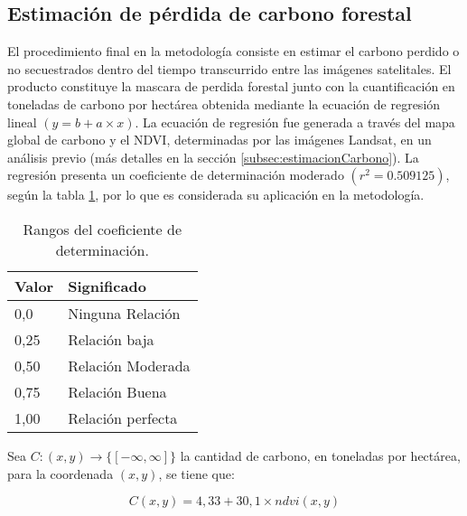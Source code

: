 \subsection{Estimaci\'on de p\'erdida de carbono forestal}
El procedimiento final en la metodolog\'ia consiste en estimar el carbono perdido o no secuestrados dentro del tiempo transcurrido entre las im\'agenes satelitales. El producto constituye la mascara de perdida forestal junto con la cuantificaci\'on en toneladas de carbono por hect\'area obtenida mediante la ecuaci\'on de regresi\'on lineal $(y= b + a \times x) $. La ecuaci\'on de regresi\'on fue generada a trav\'es del mapa global de carbono \cite{saatchi2011benchmark} y el NDVI, determinadas por las im\'agenes Landsat, en un an\'alisis previo (m\'as detalles en la secci\'on \ref{subsec:estimacionCarbono}). La regresi\'on presenta un coeficiente de determinaci\'on moderado $ (r^{2}=0.509125) $, seg\'un la tabla \ref{t:coefDeter}, por lo que es considerada su aplicaci\'on en la metodolog\'ia.
\begin{table}[H]
	\centering
	\begin{tabular}{|l|l|}
		\hline
		\textbf{Valor} & \textbf{Significado} \\ \hline
		0,0            & Ninguna Relaci\'on     \\ \hline
		0,25           & Relaci\'on baja        \\ \hline
		0,50           & Relaci\'on Moderada    \\ \hline
		0,75           & Relaci\'on Buena       \\ \hline
		1,00           & Relaci\'on perfecta    \\ \hline
	\end{tabular}
	\caption{Rangos del coeficiente de determinaci\'on.}
	\label{t:coefDeter}
\end{table}
Sea $ C:(x,y) \longrightarrow \{ [-\infty,\infty]\}$ la cantidad de carbono, en toneladas por hect\'area, para la coordenada $ (x,y) $, se tiene que: 

		\begin{equation}
			C(x,y)=4,33+30,1 \times ndvi(x,y)
		\end{equation}

